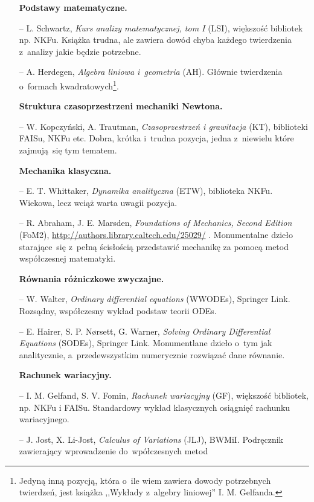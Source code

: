 \documentclass[a4paper,11pt]{article}
\begin{document}
\begin{itemize}
\item[] \textbf{Podstawy matematyczne.}
\item[--] L. Schwartz, \emph{Kurs analizy matematycznej, tom I} (LSI),
  większość bibliotek np. NKFu. Książka trudna, ale zawiera dowód
  chyba każdego twierdzenia z~analizy jakie będzie potrzebne.
\item[--] A. Herdegen, \emph{Algebra liniowa i~geometria} (AH).
  Głównie twierdzenia o~formach kwadratowych\footnote{Jedyną inną
    pozycją, która o~ile wiem zawiera dowody potrzebnych twierdzeń,
    jest książka ,,Wykłady z~algebry liniowej'' I. M. Gelfanda.}.
\item[] \textbf{Struktura czasoprzestrzeni mechaniki Newtona.}
\item[--] W. Kopczyński, A. Trautman, \emph{Czasoprzestrzeń i
    grawitacja} (KT), biblioteki FAISu, NKFu etc. Dobra, krótka
  i~trudna pozycja, jedna z~niewielu które zajmują~się tym tematem.
\item[] \textbf{Mechanika klasyczna.}
\item[--] E. T. Whittaker, \emph{Dynamika analityczna} (ETW),
  biblioteka NKFu. Wiekowa, lecz wciąż warta uwagii pozycja.
\item[--] R. Abraham, J. E. Marsden, \emph{Foundations of Mechanics,
    Second Edition} (FoM2),
  \url{http://authors.library.caltech.edu/25029/} . Monumentalne
  dzieło starające~się z~pełną ścisłością przedstawić mechanikę za
  pomocą metod współczesnej matematyki.
\item[] \textbf{Równania różniczkowe zwyczajne.}
\item[--] W. Walter, \emph{Ordinary differential equations} (WWODEs),
  Springer Link. Rozsądny, współczesny wykład podstaw teorii ODEs.
\item[--] E. Hairer, S. P. N\o rsett, G. Warner, \emph{Solving Ordinary
    Differential Equations} (SODEs), Springer Link. Monumentlane
  dzieło o~tym jak analitycznie, a~przedewszystkim numerycznie
  rozwiązać dane równanie.
\item[] \textbf{Rachunek wariacyjny.}
\item[--] I. M. Gelfand, S. V. Fomin, \emph{Rachunek wariacyjny} (GF),
  większość bibliotek, np. NKFu i FAISu. Standardowy wykład
  klasycznych osiągnięć rachunku wariacyjnego.
\item[--] J. Jost, X. Li-Jost, \emph{Calculus of Variations} (JLJ),
  BWMiI. Podręcznik zawierający wprowadzenie do~wpółczesnych metod

\end{itemize}
\end{document}
